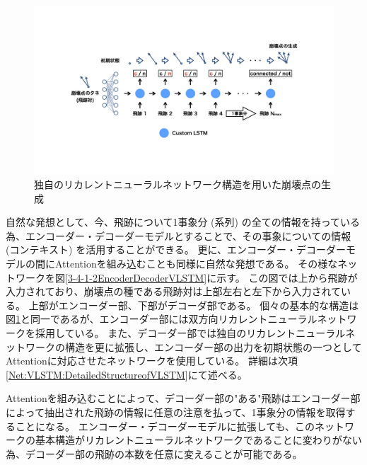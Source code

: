 \begin{figure}[h]
 \centering
 \includegraphics[trim = 0 80 0 0, width=1.0\textwidth]{Figure/3Networks/3-4-1-1SimpleVLSTM.png}
 \caption{独自のリカレントニューラルネットワーク構造を用いた崩壊点の生成}
 \label{3-4-1-1SimpleVLSTM}
\end{figure}

自然な発想として、今、飛跡について1事象分 (系列) の全ての情報を持っている為、エンコーダー・デコーダーモデルとすることで、その事象についての情報 (コンテキスト) を活用することができる。
更に、エンコーダー・デコーダーモデルの間にAttentionを組み込むことも同様に自然な発想である。
その様なネットワークを図\ref{3-4-1-2EncoderDecoderVLSTM}に示す。
この図では上から飛跡が入力されており、崩壊点の種である飛跡対は上部左右と左下から入力されている。
上部がエンコーダー部、下部がデコーダ部である。
個々の基本的な構造は図\ref{3-4-1-1SimpleVLSTM}と同一であるが、エンコーダー部には双方向リカレントニューラルネットワークを採用している。
また、デコーダー部では独自のリカレントニューラルネットワークの構造を更に拡張し、エンコーダー部の出力を初期状態の一つとしてAttentionに対応させたネットワークを使用している。
詳細は次項\ref{Net:VLSTM:DetailedStructureofVLSTM}にて述べる。

Attentionを組み込むことによって、デコーダー部の"ある"飛跡はエンコーダー部によって抽出された飛跡の情報に任意の注意を払って、1事象分の情報を取得することになる。
エンコーダー・デコーダーモデルに拡張しても、このネットワークの基本構造がリカレントニューラルネットワークであることに変わりがない為、デコーダー部の飛跡の本数を任意に変えることが可能である。

